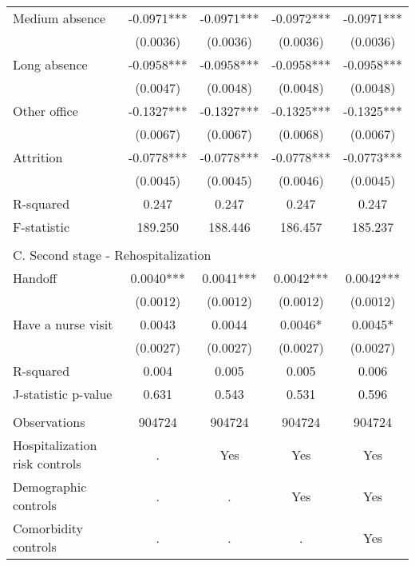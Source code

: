 \documentclass[final,12pt, notitlepage]{article}
\begin{document}
\begin{singlespace}
\begin{table}[H]
\begin{threeparttable}
{\begin{tabular*}{\textwidth}{l@{\extracolsep{\fill}}*{4}{c}}
Medium absence      &     -0.0971***&     -0.0971***&     -0.0972***&     -0.0971***\\
                    &    (0.0036)   &    (0.0036)   &    (0.0036)   &    (0.0036)   \\
Long absence        &     -0.0958***&     -0.0958***&     -0.0958***&     -0.0958***\\
                    &    (0.0047)   &    (0.0048)   &    (0.0048)   &    (0.0048)   \\
Other office        &     -0.1327***&     -0.1327***&     -0.1325***&     -0.1325***\\
                    &    (0.0067)   &    (0.0067)   &    (0.0068)   &    (0.0067)   \\
Attrition           &     -0.0778***&     -0.0778***&     -0.0778***&     -0.0773***\\
                    &    (0.0045)   &    (0.0045)   &    (0.0046)   &    (0.0045)   \\
R-squared           &       0.247   &       0.247   &       0.247   &       0.247   \\
F-statistic         &     189.250   &     188.446   &     186.457   &     185.237   \\
\\
\multicolumn{5}{l}{C. Second stage - Rehospitalization} \\
Handoff             &      0.0040***&      0.0041***&      0.0042***&      0.0042***\\
                    &    (0.0012)   &    (0.0012)   &    (0.0012)   &    (0.0012)   \\
Have a nurse visit  &      0.0043   &      0.0044   &      0.0046*  &      0.0045*  \\
                    &    (0.0027)   &    (0.0027)   &    (0.0027)   &    (0.0027)   \\
R-squared           &       0.004   &       0.005   &       0.005   &       0.006   \\
J-statistic p-value &       0.631   &       0.543   &       0.531   &       0.596   \\
\\
\midrule
Observations        &      904724   &      904724   &      904724   &      904724   \\
Hospitalization risk controls & . & Yes & Yes & Yes \\
Demographic controls & . & . & Yes & Yes \\
 Comorbidity controls & . & . & . & Yes \\

\end{tabular*}}
\end{threeparttable}
\end{table}
\end{singlespace}
\end{document}
